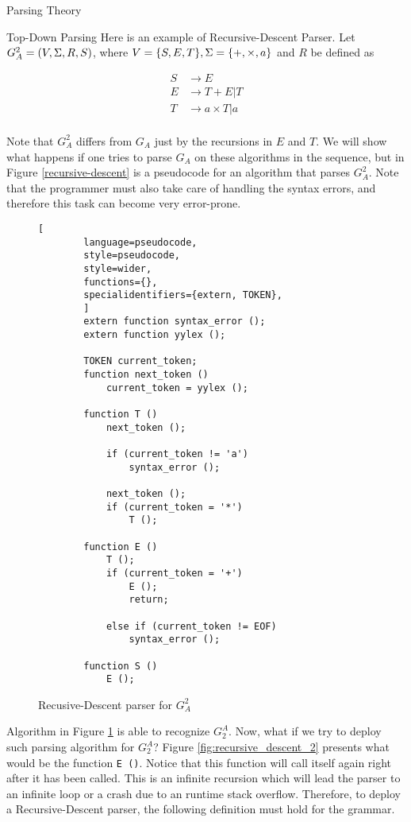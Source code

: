 \begin{section}{Parsing Theory}
\begin{subsection}{Top-Down Parsing}
Here is an example of Recursive-Descent Parser. Let $G_A^2 = (V, \Sigma, R, S)$,
where $V = \{S, E, T\}, \Sigma = \{+, \times, a\}$ and $R$ be defined as

\begin{align}
S &\rightarrow E \\
E &\rightarrow T + E | T \\
T &\rightarrow a \times T | a \\
\end{align}

Note that $G_A^2$ differs from $G_A$ just by the recursions in $E$ and $T$.
We will show what happens if one tries to parse $G_A$ on these algorithms
in the sequence, but in Figure \ref{recursive-descent} is a pseudocode for
an algorithm that parses $G_A^2$. Note that the programmer must also take
care of handling the syntax errors, and therefore this task can become
very error-prone.

\begin{figure}[ht]
	\centering
	\begin{lstlisting}[
		language=pseudocode,
		style=pseudocode,
		style=wider,
		functions={},
		specialidentifiers={extern, TOKEN},
		]
		extern function syntax_error ();
		extern function yylex ();

		TOKEN current_token;
		function next_token ()
			current_token = yylex ();

		function T ()
			next_token ();

			if (current_token != 'a')
				syntax_error ();

			next_token ();
			if (current_token = '*')
				T ();

		function E ()
			T ();
			if (current_token = '+')
				E ();
				return;
			
			else if (current_token != EOF)
				syntax_error ();
		
		function S ()
			E ();
	\end{lstlisting}
\caption{Recusive-Descent parser for $G_A^2$}
\label{fig:recursive-descent}
\end{figure}

Algorithm in Figure \ref{fig:recursive-descent} is able to recognize
$G_2^A$. Now, what if we try to deploy such parsing algorithm for
$G_2^A$? Figure \ref{fig:recursive_descent_2} presents what would be
the function \texttt{E ()}. Notice that this function will call
itself again right after
it has been called. This is an infinite recursion which will lead the
parser to an infinite loop or a crash due to an
runtime stack overflow. Therefore, to deploy a Recursive-Descent parser,
the following definition must hold for the grammar.


\end{subsection}
\end{section}
